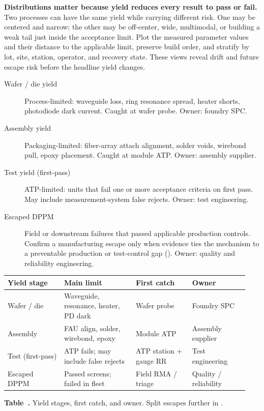 \textbf{Distributions matter because yield reduces every result to pass or
fail.} Two processes can have the same yield while carrying different risk. One
may be centered and narrow; the other may be off-center, wide, multimodal, or
building a weak tail just inside the acceptance limit. Plot the measured
parameter values and their distance to the applicable limit, preserve build
order, and stratify by lot, site, station, operator, and recovery state. These
views reveal drift and future escape risk before the headline yield changes.

\begin{description}
\item[Wafer / die yield] Process-limited: waveguide loss, ring resonance spread,
      heater shorts, photodiode dark current. Caught at wafer probe. Owner: foundry
      SPC.
\item[Assembly yield] Packaging-limited: fiber-array attach alignment, solder voids,
      wirebond pull, epoxy placement. Caught at module ATP. Owner: assembly supplier.
\item[Test yield (first-pass)] ATP-limited: units that fail one or more acceptance
      criteria on first pass. May include measurement-system false rejects. Owner:
      test engineering.
\item[Escaped DPPM] Field or downstream failures that passed applicable production
      controls. Confirm a manufacturing escape only when evidence ties the
      mechanism to a preventable production or test-control gap
      (). Owner: quality and reliability engineering.
\end{description}

\begin{table}[ht]
\label{tab:yield-split}%
\centering
\setlength{\tabcolsep}{3.5pt}%
\footnotesize
\renewcommand{\arraystretch}{1.25}%
\begin{tabular}{@{}p{0.22\linewidth}p{0.28\linewidth}p{0.22\linewidth}p{0.22\linewidth}@{}}
\toprule
Yield stage & Main limit & First catch & Owner \\
\midrule
Wafer / die & Waveguide, resonance, heater, PD dark & Wafer probe & Foundry SPC \\
\addlinespace[1.5em]
Assembly & FAU align, solder, wirebond, epoxy & Module ATP & Assembly supplier \\
\addlinespace[1.5em]
Test (first-pass) & ATP fails; may include false rejects & ATP station + gauge RR & Test engineering \\
\addlinespace[1.5em]
Escaped DPPM & Passed screens; failed in fleet & Field RMA / triage & Quality / reliability \\
\bottomrule
\end{tabular}
\par\medskip
{\raggedright\footnotesize\textbf{Table~\thetable.} Yield stages, first catch, and
owner. Split escapes further in .\par}
\end{table}
\FloatBarrier

